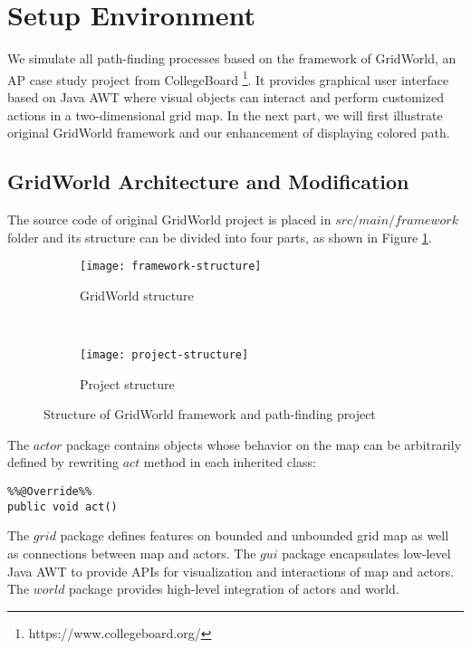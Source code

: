 \section{Setup Environment}

We simulate all path-finding processes based on the framework of
GridWorld\cite{web:gridworld}, an AP case study project from CollegeBoard
\footnote{https://www.collegeboard.org/}. It provides graphical user interface
based on Java AWT where visual objects can interact and perform customized
actions in a two-dimensional grid map. In the next part, we will first
illustrate original GridWorld framework and our enhancement of displaying
colored path. 

\subsection{GridWorld Architecture and Modification}

The source code of original GridWorld project is placed in $src/main/framework$
folder and its structure can be divided into four parts, as shown in Figure 
\ref{fig:framework-structure}.

\begin{figure}[ht]
  \centering
  \begin{subfigure}[b]{0.45\textwidth}
    \texttt{[image: framework-structure]}
    \caption{GridWorld structure}
    \label{fig:framework-structure}
  \end{subfigure}
  ~
  \begin{subfigure}[b]{0.46\textwidth}
    \texttt{[image: project-structure]}
    \caption{Project structure}
    \label{fig:project-structure}
  \end{subfigure}
\caption{Structure of GridWorld framework and path-finding project}
\end{figure}

The $actor$ package contains objects whose behavior on the map can be arbitrarily 
defined by rewriting $act$ method in each inherited class:

\begin{lstlisting}
%%@Override%%
public void act()
\end{lstlisting}

The $grid$ package defines features on bounded and unbounded grid map as well 
as connections between map and actors. The $gui$ package encapsulates low-level
Java AWT to provide APIs for visualization and interactions of map and actors.
The $world$ package provides high-level integration of actors and world.

